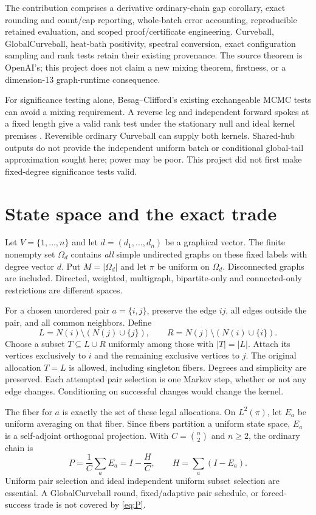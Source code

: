 \documentclass[11pt]{article}
\newcommand{\Om}{\Omega_d}
\begin{document}
The contribution comprises a derivative ordinary-chain gap corollary, exact rounding and count/cap reporting, whole-batch error accounting, reproducible retained evaluation, and scoped proof/certificate engineering. Curveball, GlobalCurveball, heat-bath positivity, spectral conversion, exact configuration sampling and rank tests retain their existing provenance. The source theorem is OpenAI's; this project does not claim a new mixing theorem, firstness, or a dimension-13 graph-runtime consequence.

For significance testing alone, Besag--Clifford's existing exchangeable MCMC tests can avoid a mixing requirement. A reverse leg and independent forward spokes at a fixed length give a valid rank test under the stationary null and ideal kernel premises \cite{HOWES}. Reversible ordinary Curveball can supply both kernels. Shared-hub outputs do not provide the independent uniform batch or conditional global-tail approximation sought here; power may be poor. This project did not first make fixed-degree significance tests valid.

\section{State space and the exact trade}
Let $V=\{1,\ldots,n\}$ and let $d=(d_1,\ldots,d_n)$ be a graphical vector. The finite nonempty set $\Om$ contains \emph{all} simple undirected graphs on these fixed labels with degree vector $d$. Put $M=|\Om|$ and let $\pi$ be uniform on $\Om$. Disconnected graphs are included. Directed, weighted, multigraph, bipartite-only and connected-only restrictions are different spaces.

For a chosen unordered pair $a=\{i,j\}$, preserve the edge $ij$, all edges outside the pair, and all common neighbors. Define
\[
 L=N(i)\setminus(N(j)\cup\{j\}),\qquad
 R=N(j)\setminus(N(i)\cup\{i\}).
\]
Choose a subset $T\subseteq L\cup R$ uniformly among those with $|T|=|L|$. Attach its vertices exclusively to $i$ and the remaining exclusive vertices to $j$. The original allocation $T=L$ is allowed, including singleton fibers. Degrees and simplicity are preserved. Each attempted pair selection is one Markov step, whether or not any edge changes. Conditioning on successful changes would change the kernel.

The fiber for $a$ is exactly the set of these legal allocations. On $L^2(\pi)$, let $E_a$ be uniform averaging on that fiber. Since fibers partition a uniform state space, $E_a$ is a self-adjoint orthogonal projection. With $C=\binom n2$ and $n\ge2$, the ordinary chain is
\begin{equation}\label{eq:P}
 P=\frac1C\sum_a E_a=I-\frac HC,
 \qquad H=\sum_a(I-E_a).
\end{equation}
Uniform pair selection and ideal independent uniform subset selection are essential. A GlobalCurveball round, fixed/adaptive pair schedule, or forced-success trade is not covered by \eqref{eq:P}.
\end{document}
